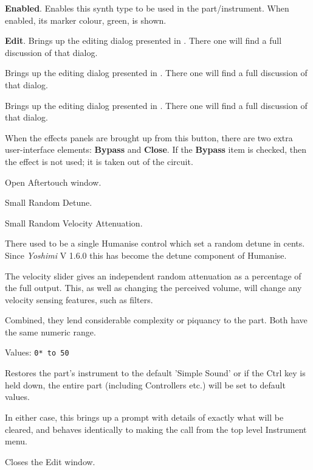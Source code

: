 
   \begin{enumber}
      \item \textbf{Enabled}.
      Enables this synth type to be used in the part/instrument.
      When enabled, its marker colour, green, is shown.
      \item \textbf{Edit}.
      Brings up the editing dialog presented in
      .
      There one will find a full discussion of that dialog.
   \end{enumber}

   Brings up the editing dialog presented in
   .
   There one will find a full discussion of that dialog.

   Brings up the editing dialog presented in
   .
   There one will find a full discussion of that dialog.

   When the effects panels are brought up from this button, there are two extra
   user-interface elements:
   \textbf{Bypass} and \textbf{Close}.
   If the \textbf{Bypass} item is checked, then the effect is not
   used; it is taken out of the circuit.

   Open Aftertouch window.

   Small Random Detune.

   Small Random Velocity Attenuation.

   There used to be a single Humanise control which set a random detune in cents.
   Since \textsl{Yoshimi} V 1.6.0 this has become the detune component of Humanise.

   The velocity slider gives an independent random attenuation as a percentage of
   the full output. This, as well as changing the perceived volume, will change any
   velocity sensing features, such as filters.

   Combined, they lend considerable complexity or piquancy to the part. Both have
   the same numeric range.

   Values: \texttt{0* to 50}

   Restores the part's instrument to the default 'Simple Sound' or if the Ctrl key
   is held down, the entire part (including Controllers etc.) will be set to
   default values.

   In either case, this brings up a prompt with details of exactly what will be
   cleared, and behaves identically to making the call from the top level
   Instrument menu.

   Closes the Edit window.


